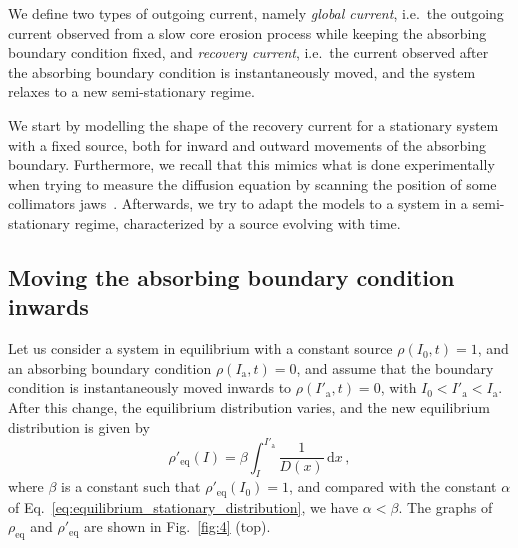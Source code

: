 We define two types of outgoing current, namely \textsl{global current}, i.e.\ the outgoing current observed from a slow core erosion process while keeping the absorbing boundary condition fixed, and \textsl{recovery current}, i.e.\ the current observed after the absorbing boundary condition is instantaneously moved, and the system relaxes to a new semi-stationary regime.

We start by modelling the shape of the recovery current for a stationary system with a fixed source, both for inward and outward movements of the absorbing boundary. Furthermore, we recall that this mimics what is done experimentally when trying to measure the diffusion equation by scanning the position of some collimators jaws~{\cite{MESS1994279,flilleriii:pac03-rpag004,stancari2011diffusion,stancari:ipac11-tupz033,Stancari:1637929,PhysRevSTAB.16.021003,PhysRevAccelBeams.23.044802}}. Afterwards, we try to adapt the models to a system in a semi-stationary regime, characterized by a source evolving with time.


\subsection{Moving the absorbing boundary condition inwards}


Let us consider a system in equilibrium with a constant source $\rho(I_0, t)=1$, and an absorbing boundary condition $\rho(I_\mathrm{a}, t)=0$, and assume that the boundary condition is instantaneously moved inwards to $\rho(I'_\mathrm{a}, t)=0$, with $I_0 < I'_\mathrm{a} < I_\mathrm{a}$. After this change, the equilibrium distribution varies, and the new equilibrium distribution is given by
\begin{equation}
    \rho'_\text{eq}(I) = \beta \int_I^{I'_\mathrm{a}} \frac{1}{D(x)}\,\mathrm{d}x\,,
\end{equation}
where $\beta$ is a constant such that $\rho'_\text{eq}(I_0)=1$, and compared with the constant $\alpha$ of Eq.~\eqref{eq:equilibrium_stationary_distribution}, we have $\alpha < \beta$. The graphs of $\rho_\mathrm{eq}$ and $\rho'_\mathrm{eq}$ are shown in Fig.~\ref{fig:4} (top).


